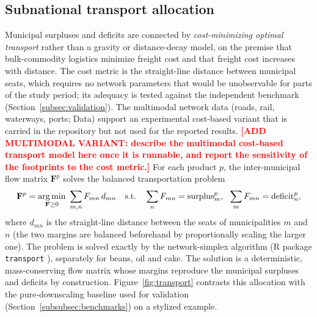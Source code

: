 \subsection{Subnational transport allocation}\label{subsec:transport}
Municipal surpluses and deficits are connected by \emph{cost-minimizing
optimal transport} rather than a gravity or distance-decay model, on the
premise that bulk-commodity logistics minimize freight cost and that freight
cost increases with distance. The cost metric is the straight-line distance
between municipal seats, which requires no network parameters that would be
unobservable for parts of the study period; its adequacy is tested against
the independent benchmark
(Section~\ref{subsec:validation}). The multimodal network data (roads, rail,
waterways, ports; Data) support an experimental cost-based variant that is
carried in the repository but not used for the reported results.
\textcolor{red}{\textbf{[ADD MULTIMODAL VARIANT: describe the multimodal
cost-based transport model here once it is runnable, and report the
sensitivity of the footprints to the cost metric.]}} For each
product $p$, the inter-municipal flow matrix $\mathbf{F}^p$ solves the
balanced transportation problem
\begin{equation}\label{eq:ot}
  \mathbf{F}^{p}=\operatorname*{arg\,min}_{\mathbf{F}\ge0}\ \sum_{m,n}F_{mn}\,d_{mn}
  \quad\text{s.t.}\quad
  \sum_{n}F_{mn}=\text{surplus}^p_m,\ \
  \sum_{m}F_{mn}=\text{deficit}^p_n,
\end{equation}
where $d_{mn}$ is the straight-line distance between the seats of
municipalities $m$ and $n$ (the two margins are balanced beforehand by
proportionally scaling the larger one). The problem is solved exactly by the
network-simplex algorithm (R package \texttt{transport}
\cite{schuhmacher2023transport}), separately for beans, oil and cake. The
solution is a deterministic, mass-conserving flow matrix whose margins
reproduce the municipal surpluses and deficits by construction.
Figure~\ref{fig:transport} contrasts this allocation with the
pure-downscaling baseline used for validation
(Section~\ref{subsubsec:benchmarks}) on a stylized example.

